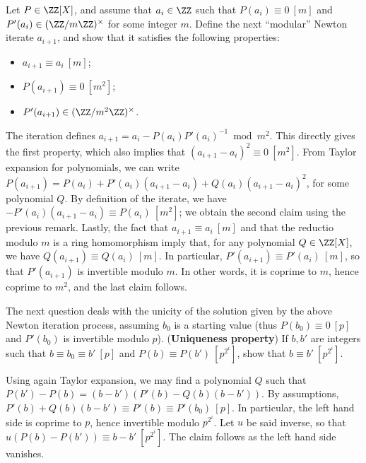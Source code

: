 \documentclass[11pt]{exam}
\theoremstyle{definition}
\begin{document}
{\begin{questions}
    \question Let $P \in \ZZ[X]$, and assume that $a_i\in \ZZ$ such that $P(a_i) \equiv 0~[m]$ and $P'(a_i) \in (\ZZ/m\ZZ)^\times$ for some integer $m$. Define the next ``modular'' Newton iterate $a_{i+1}$, and show that it satisfies the following properties:
    \begin{itemize}
    \item $a_{i+1} \equiv a_i~[m]$;
    \item $P(a_{i+1}) \equiv 0~[m^2]$;
    \item $P'(a_{i+1}) \in (\ZZ/m^2\ZZ)^\times$.
    \end{itemize}
    \begin{solution}
      The iteration defines $a_{i+1} = a_i - P(a_i)P'(a_i)^{-1} \bmod m^2$. This directly gives the first property, which also implies that $(a_{i+1}-a_i)^2 \equiv 0~[m^2]$. From Taylor expansion for polynomials, we can write $P(a_{i+1})=P(a_i)+P'(a_i)(a_{i+1}-a_i)+Q(a_i)(a_{i+1}-a_i)^2$, for some polynomial $Q$. By definition of the iterate, we have $-P'(a_i)(a_{i+1}-a_i) \equiv P(a_i)~[m^2]$; we obtain the second claim using the previous remark. Lastly, the fact that $a_{i+1} \equiv a_i~[m]$ and that the reductio modulo $m$ is a ring homomorphism imply that, for any polynomial $Q \in \ZZ[X]$, we have $Q(a_{i+1}) \equiv Q(a_i)~[m]$. In particular, $P'(a_{i+1}) \equiv P'(a_i)~[m]$, so that $P'(a_{i+1})$ is invertible modulo $m$. In other words, it is coprime to $m$, hence coprime to $m^2$, and the last claim follows.
    \end{solution}

    The next question deals with the unicity of the solution given by the above Newton iteration process, assuming $b_0$ is a starting value (thus $P(b_0)\equiv 0~[p]$ and $P'(b_0)$ is invertible modulo $p$).
    \question (\textbf{Uniqueness property})  If $b,b'$ are integers such that $b \equiv b_0 \equiv b'~[p]$ and $P(b) \equiv P(b')~[p^{2^i}]$, show that $b\equiv b'~[p^{2^i}]$.
    \begin{solution}
      Using again Taylor expansion, we may find a polynomial $Q$ such that $P(b')-P(b) = (b-b')(P'(b)-Q(b)(b-b'))$. By assumptions, $P'(b)+Q(b)(b-b') \equiv P'(b) \equiv P'(b_0)~[p]$. In particular, the left hand side is coprime to $p$, hence invertible modulo $p^{2^i}$. Let $u$ be said inverse, so that $u(P(b)-P(b')) \equiv b-b'~[p^{2^i}]$. The claim follows as the left hand side vanishes.
      
    \end{solution}
        


\end{questions}}
\end{document}
